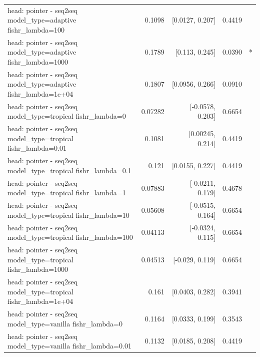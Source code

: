 \documentclass[10pt]{article}
\makeatletter
\newcommand{\stackcell}[1]{\begin{tabular}[t]{@{}l@{}}#1\end{tabular}}
\makeatother
\begin{document}
{\begin{longtable}{lrrrl}
\stackcell{head: pointer - seq2seq\\\footnotesize model\_type=adaptive fishr\_lambda=100 } & 0.1098 & [0.0127, 0.207] & 0.4419 & \\
\stackcell{head: pointer - seq2seq\\\footnotesize model\_type=adaptive fishr\_lambda=1000 } & 0.1789 & [0.113, 0.245] & 0.0390 & *\\
\stackcell{head: pointer - seq2seq\\\footnotesize model\_type=adaptive fishr\_lambda=1e+04 } & 0.1807 & [0.0956, 0.266] & 0.0910 & \\
\stackcell{head: pointer - seq2seq\\\footnotesize model\_type=tropical fishr\_lambda=0 } & 0.07282 & [-0.0578, 0.203] & 0.6654 & \\
\stackcell{head: pointer - seq2seq\\\footnotesize model\_type=tropical fishr\_lambda=0.01 } & 0.1081 & [0.00245, 0.214] & 0.4419 & \\
\stackcell{head: pointer - seq2seq\\\footnotesize model\_type=tropical fishr\_lambda=0.1 } & 0.121 & [0.0155, 0.227] & 0.4419 & \\
\stackcell{head: pointer - seq2seq\\\footnotesize model\_type=tropical fishr\_lambda=1 } & 0.07883 & [-0.0211, 0.179] & 0.4678 & \\
\stackcell{head: pointer - seq2seq\\\footnotesize model\_type=tropical fishr\_lambda=10 } & 0.05608 & [-0.0515, 0.164] & 0.6654 & \\
\stackcell{head: pointer - seq2seq\\\footnotesize model\_type=tropical fishr\_lambda=100 } & 0.04113 & [-0.0324, 0.115] & 0.6654 & \\
\stackcell{head: pointer - seq2seq\\\footnotesize model\_type=tropical fishr\_lambda=1000 } & 0.04513 & [-0.029, 0.119] & 0.6654 & \\
\stackcell{head: pointer - seq2seq\\\footnotesize model\_type=tropical fishr\_lambda=1e+04 } & 0.161 & [0.0403, 0.282] & 0.3941 & \\
\stackcell{head: pointer - seq2seq\\\footnotesize model\_type=vanilla fishr\_lambda=0 } & 0.1164 & [0.0333, 0.199] & 0.3543 & \\
\stackcell{head: pointer - seq2seq\\\footnotesize model\_type=vanilla fishr\_lambda=0.01 } & 0.1132 & [0.0185, 0.208] & 0.4419 & \\

\end{longtable}}
\end{document}
